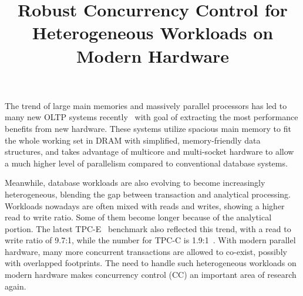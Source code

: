 \documentclass[preprint]{sig-alternate-nocprt}
\begin{document}

\title{Robust Concurrency Control for Heterogeneous Workloads on Modern Hardware}

\author{
\alignauthor
}

\maketitle

The trend of large main memories and massively parallel processors has led to many new OLTP systems recently~\cite{HStore,Hyper,Hekaton,Silo} with goal of extracting the most performance benefits from new hardware. These systems utilize spacious main memory to fit the whole working set in DRAM with simplified, memory-friendly data structures, and takes advantage of multicore and multi-socket hardware to allow a much higher level of parallelism compared to conventional database systems.

Meanwhile, database workloads are also evolving to become increasingly heterogeneous, blending the gap between transaction and analytical processing. Workloads nowadays are often mixed with reads and writes, showing a higher read to write ratio. Some of them become longer because of the analytical portion. The latest TPC-E~\cite{TPC-E} benchmark also reflected this trend, with a read to write ratio of 9.7:1, while the number for TPC-C is 1.9:1~\cite{TPC-Compare}. With modern parallel hardware, many more concurrent transactions are allowed to co-exist, possibly with overlapped footprints. The need to handle such heterogeneous workloads on modern hardware makes concurrency control (CC) an important area of research again.
\end{document}
